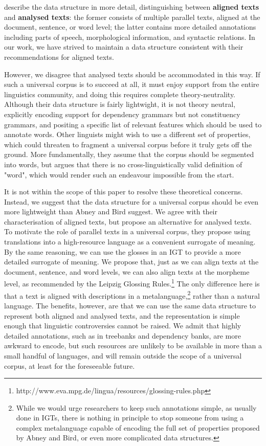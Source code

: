 \documentclass[11pt]{article}
\begin{document}
 describe the data structure in more detail, distinguishing between \textbf{aligned texts} and \textbf{analysed texts}: the former consists of multiple parallel texts, aligned at the document, sentence, or word level; the latter contains more detailed annotations including parts of speech, morphological information, and syntactic relations. In our work, we have strived to maintain a data structure consistent with their recommendations for aligned texts.

However, we disagree that analysed texts should be accommodated in this way. If such a universal corpus is to succeed at all, it must enjoy support from the entire linguistics community, and doing this requires complete theory-neutrality. Although their data structure is fairly lightwight, it is not theory neutral, explicitly encoding support for dependency grammars but not constituency grammars, and positing a specific list of relevant features which should be used to annotate words. Other linguists might wish to use a different set of properties, which could threaten to fragment a universal corpus before it truly gets off the ground. More fundamentally, they assume that the corpus should be segmented into words, but  argues that there is no cross-linguistically valid definition of "word", which would render such an endeavour impossible from the start.

It is not within the scope of this paper to resolve these theoretical concerns. Instead, we suggest that the data structure for a universal corpus should be even more lightweight than Abney and Bird suggest. We agree with their characterisation of aligned texts, but propose an alternative for analysed texts. To motivate the role of parallel texts in a universal corpus, they propose using translations into a high-resource language as a convenient surrogate of meaning. By the same reasoning, we can use the glosses in an IGT to provide a more detailed surrogate of meaning. We propose that, just as we can align texts at the document, sentence, and word levels, we can also align texts at the morpheme level, as recommended by the Leipzig Glossing Rules.\footnote{http://www.eva.mpg.de/lingua/resources/glossing-rules.php} The only difference here is that a text is aligned with descriptions in a metalanguage,\footnote{While we would urge researchers to keep such annotations simple, as usually done in IGTs, there is nothing in principle to stop someone from using a complex metalanguage capable of encoding the full set of properties proposed by Abney and Bird, or even more complicated data structures.} rather than a natural language. The benefits, however, are that we can use the same data structure to represent both aligned and analysed texts, and the representation is simple enough that linguistic controversies cannot be raised. We admit that highly detailed annotations, such as in treebanks and dependency banks, are more awkward to encode, but such resources are unlikely to be available in more than a small handful of languages, and will remain outside the scope of a universal corpus, at least for the foreseeable future.
\end{document}
